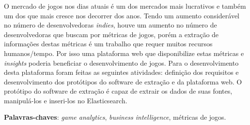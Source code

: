 \begin{resumo}
O mercado de jogos nos dias atuais é um dos mercados mais lucrativos e também um dos que mais cresce nos decorrer dos anos. Tendo um aumento considerável no número de desenvolvedoras \textit{indies}, houve um aumento no número de desenvolvedoras que buscam por métricas de jogos, porém a extração de informações destas métricas é um trabalho que requer muitos recursos humanos/tempo. Por isso uma plataforma web que disponibilize estas métricas e \textit{insights} poderia beneficiar o desenvolvimento de jogos. Para o desenvolvimento desta plataforma foram feitas as seguintes atividades: definição dos requisitos e desenvolvimento dos protótipos do software de extração e da plataforma web. O protótipo do software de extração é capaz de extrair os dados de suas fontes, manipulá-los e inseri-los no Elasticsearch.

\vspace{\onelineskip}
    
\noindent
\textbf{Palavras-chaves}: \textit{game analytics}, \textit{business intelligence}, métricas de jogos.
\end{resumo}
